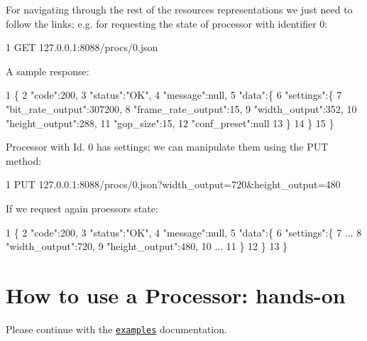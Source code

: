 For navigating through the rest of the resources representations we just need to follow the links; e.\+g. for requesting the state of processor with identifier \textquotesingle{}0\textquotesingle{}\+: 
\begin{DoxyCode}
1 GET 127.0.0.1:8088/procs/0.json
\end{DoxyCode}
 A sample response\+: 
\begin{DoxyCode}
1 \{
2    "code":200,
3    "status":"OK",
4    "message":null,
5    "data":\{
6       "settings":\{
7          "bit\_rate\_output":307200,
8          "frame\_rate\_output":15,
9          "width\_output":352,
10          "height\_output":288,
11          "gop\_size":15,
12          "conf\_preset":null
13       \}
14    \}
15 \}
\end{DoxyCode}


Processor with Id. \textquotesingle{}0\textquotesingle{} has settings; we can manipulate them using the P\+UT method\+: 
\begin{DoxyCode}
1 PUT 127.0.0.1:8088/procs/0.json?width\_output=720&height\_output=480
\end{DoxyCode}


If we request again proessor\textquotesingle{}s state\+: 
\begin{DoxyCode}
1 \{
2    "code":200,
3    "status":"OK",
4    "message":null,
5    "data":\{
6       "settings":\{
7           ...
8          "width\_output":720,
9          "height\_output":480,
10          ...
11       \}
12    \}
13 \}
\end{DoxyCode}


\section*{How to use a Processor\+: hands-\/on }

Please continue with the \href{md_EXAMPLES.html}{\tt examples} documentation. 